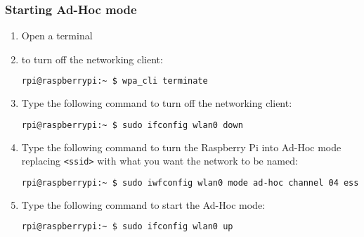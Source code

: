 \documentclass{article}
\begin{document}
    \subsubsection{Starting Ad-Hoc mode}
    \begin{enumerate}
        \item Open a terminal
        \item   to turn off the networking client:
            \begin{lstlisting}[language=bash]
            rpi@raspberrypi:~ $ wpa_cli terminate
            \end{lstlisting}
        \item Type the following command to turn off the networking client:
            \begin{lstlisting}[language=bash]
            rpi@raspberrypi:~ $ sudo ifconfig wlan0 down
            \end{lstlisting}
        \item Type the following command to turn the Raspberry Pi into Ad-Hoc mode replacing \verb!<ssid>! with what you want the network to be named:
            \begin{lstlisting}[language=bash]
            rpi@raspberrypi:~ $ sudo iwfconfig wlan0 mode ad-hoc channel 04 essid <ssid>
            \end{lstlisting}
        \item Type the following command to start the Ad-Hoc mode:
            \begin{lstlisting}[language=bash]
                rpi@raspberrypi:~ $ sudo ifconfig wlan0 up
                \end{lstlisting}
    \end{enumerate}
\end{document}
